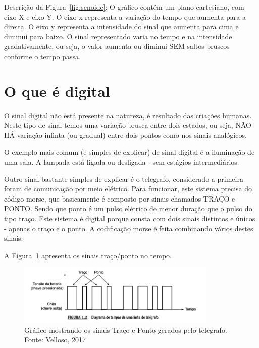 Descrição da Figura~\ref{fig:senoide}:  O gráfico contém um plano cartesiano, com eixo X e eixo Y. O eixo x representa a variação do tempo que aumenta para a direita. O eixo y representa a intensidade do sinal que aumenta para cima e diminui para baixo. O sinal representado varia no tempo e na intensidade gradativamente, ou seja, o valor aumenta ou diminui SEM saltos bruscos conforme o tempo passa.


\section{O que é digital}
\label{sinalDigital}

O sinal digital não está presente na natureza, é resultado das criações humanas. Neste tipo de sinal temos uma variação brusca entre dois estados, ou seja, NÃO HÁ variação infinta (ou gradual) entre dois pontos como nos sinais analógicos. 

O exemplo mais comum (e simples de explicar) de sinal digital é a iluminação de uma sala. A lampada está ligada ou desligada - sem estágios intermediários.

Outro sinal bastante simples de explicar é o telegrafo, considerado a primeira foram de comunicação por meio elétrico. Para funcionar, este sistema precisa do código morse, que basicamente é composto por sinais chamados TRAÇO e PONTO. Sendo que ponto é um pulso elétrico de menor duração que o pulso do tipo traço. Este sistema é digital porque consta com dois sinais distintos e únicos - apenas o traço e o ponto. A codificação morse é feita combinando vários destes sinais. 

A Figura~\ref{fig:telegrafo} apresenta os sinais traço/ponto no tempo.

\begin{figure}[h]
	\begin{center}
		\includegraphics[width=0.85\textwidth]{img/sinais/telegrafo.png}
		\caption{Gráfico mostrando os sinais Traço e Ponto gerados pelo telegrafo. Fonte: Velloso, 2017}
		\label{fig:telegrafo}
	\end{center}
\end{figure}

